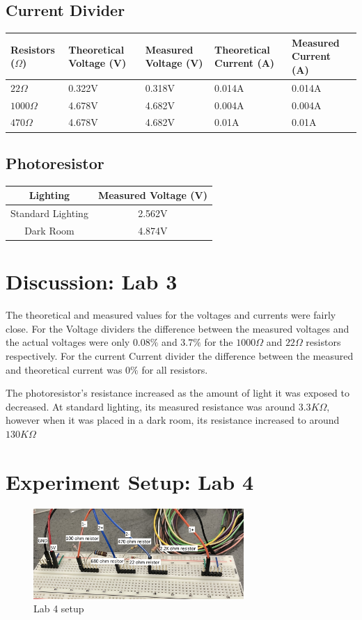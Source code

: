 \documentclass[12pt]{article}
\begin{document}
\subsection*{Current Divider}
\begin{center}
\begin{tabular}{||m{1.5cm}|m{2cm}|m{2cm}|m{2cm}|m{2cm}||}
\hline
Resistors ($\Omega$) & Theoretical Voltage (V) & Measured Voltage (V) & Theoretical Current (A) & Measured Current (A)\\
\hline
\hline
$22\Omega$ & 0.322V & 0.318V&0.014A &0.014A\\
\hline
$1000\Omega$ &4.678V &4.682V &0.004A &0.004A\\
\hline
$470\Omega$ &4.678V &4.682V &0.01A &0.01A\\
\hline
\end{tabular}
\end{center}
\subsection*{Photoresistor}
\begin{center}
\begin{tabular}{||c|c ||}
\hline
Lighting & Measured Voltage (V)\\
\hline
\hline
Standard Lighting & 2.562V\\
\hline
Dark Room  &4.874V\\
\hline
\end{tabular}
\end{center}
\section*{Discussion: Lab 3}
The theoretical and measured values for the voltages and currents were fairly close. For the Voltage dividers the difference between the measured voltages and the actual voltages were only $0.08\%$ and $3.7\%$ for the $1000\Omega$ and $22\Omega$ resistors respectively. For the current  Current divider the difference between the measured and theoretical current was $0\%$ for all resistors.

The photoresistor's resistance increased as the amount of light it was exposed to decreased. At standard lighting, its measured resistance was around $3.3K\Omega$, however when it was placed in a dark room, its resistance increased to around $130K\Omega$
\pagebreak
\section*{Experiment Setup: Lab 4}
\begin{figure}[h]
\includegraphics[width=8cm]{Lab4}
\centering
\caption{Lab 4 setup}
\end{figure}
\end{document}
